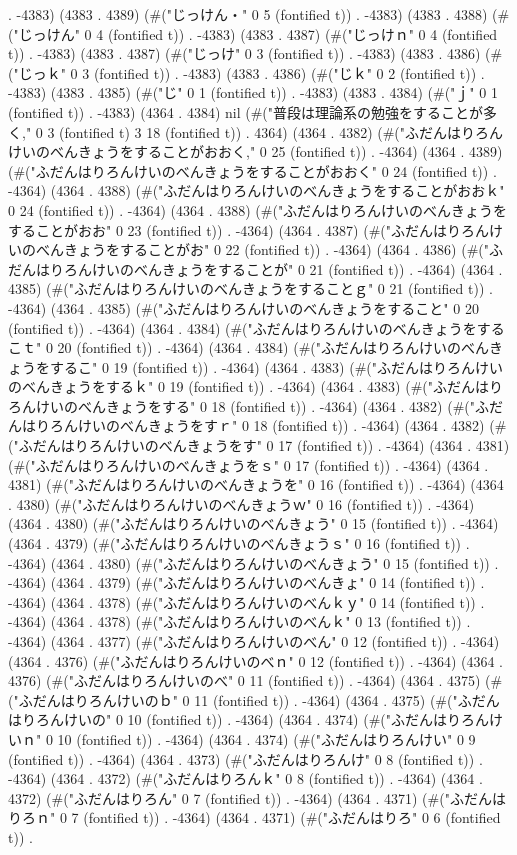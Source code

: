 . -4383) (4383 . 4389) (#("じっけん・" 0 5 (fontified t)) . -4383) (4383 . 4388) (#("じっけん" 0 4 (fontified t)) . -4383) (4383 . 4387) (#("じっけｎ" 0 4 (fontified t)) . -4383) (4383 . 4387) (#("じっけ" 0 3 (fontified t)) . -4383) (4383 . 4386) (#("じっｋ" 0 3 (fontified t)) . -4383) (4383 . 4386) (#("じｋ" 0 2 (fontified t)) . -4383) (4383 . 4385) (#("じ" 0 1 (fontified t)) . -4383) (4383 . 4384) (#("ｊ" 0 1 (fontified t)) . -4383) (4364 . 4384) nil (#("普段は理論系の勉強をすることが多く," 0 3 (fontified t) 3 18 (fontified t)) . 4364) (4364 . 4382) (#("ふだんはりろんけいのべんきょうをすることがおおく," 0 25 (fontified t)) . -4364) (4364 . 4389) (#("ふだんはりろんけいのべんきょうをすることがおおく" 0 24 (fontified t)) . -4364) (4364 . 4388) (#("ふだんはりろんけいのべんきょうをすることがおおｋ" 0 24 (fontified t)) . -4364) (4364 . 4388) (#("ふだんはりろんけいのべんきょうをすることがおお" 0 23 (fontified t)) . -4364) (4364 . 4387) (#("ふだんはりろんけいのべんきょうをすることがお" 0 22 (fontified t)) . -4364) (4364 . 4386) (#("ふだんはりろんけいのべんきょうをすることが" 0 21 (fontified t)) . -4364) (4364 . 4385) (#("ふだんはりろんけいのべんきょうをすることｇ" 0 21 (fontified t)) . -4364) (4364 . 4385) (#("ふだんはりろんけいのべんきょうをすること" 0 20 (fontified t)) . -4364) (4364 . 4384) (#("ふだんはりろんけいのべんきょうをするこｔ" 0 20 (fontified t)) . -4364) (4364 . 4384) (#("ふだんはりろんけいのべんきょうをするこ" 0 19 (fontified t)) . -4364) (4364 . 4383) (#("ふだんはりろんけいのべんきょうをするｋ" 0 19 (fontified t)) . -4364) (4364 . 4383) (#("ふだんはりろんけいのべんきょうをする" 0 18 (fontified t)) . -4364) (4364 . 4382) (#("ふだんはりろんけいのべんきょうをすｒ" 0 18 (fontified t)) . -4364) (4364 . 4382) (#("ふだんはりろんけいのべんきょうをす" 0 17 (fontified t)) . -4364) (4364 . 4381) (#("ふだんはりろんけいのべんきょうをｓ" 0 17 (fontified t)) . -4364) (4364 . 4381) (#("ふだんはりろんけいのべんきょうを" 0 16 (fontified t)) . -4364) (4364 . 4380) (#("ふだんはりろんけいのべんきょうｗ" 0 16 (fontified t)) . -4364) (4364 . 4380) (#("ふだんはりろんけいのべんきょう" 0 15 (fontified t)) . -4364) (4364 . 4379) (#("ふだんはりろんけいのべんきょうｓ" 0 16 (fontified t)) . -4364) (4364 . 4380) (#("ふだんはりろんけいのべんきょう" 0 15 (fontified t)) . -4364) (4364 . 4379) (#("ふだんはりろんけいのべんきょ" 0 14 (fontified t)) . -4364) (4364 . 4378) (#("ふだんはりろんけいのべんｋｙ" 0 14 (fontified t)) . -4364) (4364 . 4378) (#("ふだんはりろんけいのべんｋ" 0 13 (fontified t)) . -4364) (4364 . 4377) (#("ふだんはりろんけいのべん" 0 12 (fontified t)) . -4364) (4364 . 4376) (#("ふだんはりろんけいのべｎ" 0 12 (fontified t)) . -4364) (4364 . 4376) (#("ふだんはりろんけいのべ" 0 11 (fontified t)) . -4364) (4364 . 4375) (#("ふだんはりろんけいのｂ" 0 11 (fontified t)) . -4364) (4364 . 4375) (#("ふだんはりろんけいの" 0 10 (fontified t)) . -4364) (4364 . 4374) (#("ふだんはりろんけいｎ" 0 10 (fontified t)) . -4364) (4364 . 4374) (#("ふだんはりろんけい" 0 9 (fontified t)) . -4364) (4364 . 4373) (#("ふだんはりろんけ" 0 8 (fontified t)) . -4364) (4364 . 4372) (#("ふだんはりろんｋ" 0 8 (fontified t)) . -4364) (4364 . 4372) (#("ふだんはりろん" 0 7 (fontified t)) . -4364) (4364 . 4371) (#("ふだんはりろｎ" 0 7 (fontified t)) . -4364) (4364 . 4371) (#("ふだんはりろ" 0 6 (fontified t)) . 